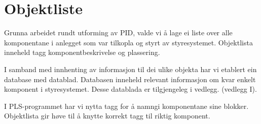 \section{Objektliste}
\thispagestyle{fancy}

Grunna arbeidet rundt utforming av \gls{PID}, valde vi å lage ei liste over alle komponentane i anlegget som var tilkopla og styrt av styresystemet.
Objektlista inneheld tagg komponentbeskrivelse og plassering. 

I samband med innhenting av informasjon til dei ulike objekta har vi etablert ein database med datablad.
Databasen inneheld relevant informasjon om kvar enkelt komponent i styresystemet.\newline
Desse datablada er tilgjengeleg i vedlegg. (vedlegg I). 

I \gls{PLS}-programmet har vi nytta tagg for å namngi komponentane sine blokker.\newline
Objektlista gir høve til å knytte korrekt tagg til riktig komponent.

\newpage

